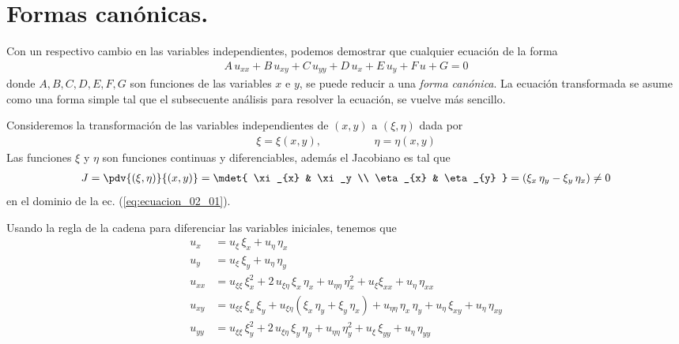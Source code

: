 \section{Formas canónicas.}
Con un respectivo cambio en las variables independientes, podemos demostrar que cualquier ecuación de la forma
\begin{align}
A \, u_{xx} + B \, u_{xy} + C \, u_{yy} + D \, u_{x} + E \, u_{y} + F \, u + G = 0
\label{eq:ecuacion_02_01}    
\end{align}
donde $A, B, C, D, E, F, G$ son funciones de las variables $x$ e $y$, se puede reducir a una \emph{forma canónica}. La ecuación transformada se asume como una forma simple tal que el subsecuente análisis para resolver la ecuación, se vuelve más sencillo.
\par
Consideremos la transformación de las variables independientes de $(x, y)$ a $(\xi, \eta)$ dada por
\begin{align}
\xi = \xi (x, y), \hspace{2cm} \eta = \eta (x, y)
\label{eq:ecuacion_02_02}
\end{align}
Las funciones $\xi$ y $\eta$ son funciones continuas y diferenciables, además el Jacobiano es tal que
\begin{align}
J = \pdv{(\xi, \eta)}{(x, y)} = \mdet{
\xi_{x} & \xi_y \\
\eta_{x} & \eta_{y}
} =
(\xi_{x} \, \eta_{y} - \xi_{y} \, \eta_{x}) \neq 0
\label{eq:ecuacion_02_03}    
\end{align}
en el dominio de la ec. (\ref{eq:ecuacion_02_01}).
\par
Usando la regla de la cadena para diferenciar las variables iniciales, tenemos que
\begin{align*}
u_{x} &= u_{\xi} \, \xi_{x} + u_{\eta} \, \eta_{x} \\
u_{y} &= u_{\xi} \, \xi_{y} + u_{\eta} \, \eta_{y} \\
u_{xx} &= u_{\xi \xi} \, \xi_{x}^{2} + 2 \, u_{\xi \eta} \, \xi_{x} \, \eta_{x} + u_{\eta \eta} \, \eta_{x}^{2} + u_{\xi} \xi_{x x} + u_{\eta} \, \eta_{xx} \\
u_{xy} &= u_{\xi \xi} \, \xi_{x} \, \xi_{y} + u_{\xi \eta} (\xi_{x} \, \eta_{y} + \xi_{y} \, \eta_{x}) + u_{\eta \eta} \, \eta_{x} \, \eta_{y} + u_{\eta} \, \xi_{x y} + u_{\eta} \, \eta_{x y} \\
u_{yy} &= u_{\xi \xi} \, \xi_{y}^{2} + 2 \, u_{\xi \eta} \, \xi_{y} \, \eta_{y} + u_{\eta \eta} \, \eta_{y}^{2} + u_{\xi} \, \xi_{y y} + u_{\eta} \, \eta_{yy}
\end{align*}
